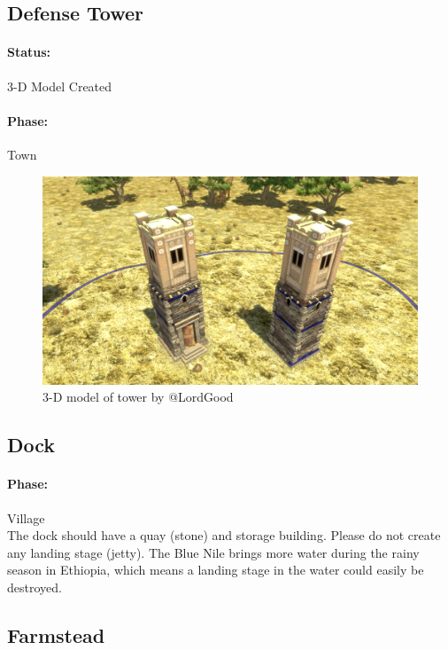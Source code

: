 \documentclass[a4paper,12pt]{scrreprt}
\begin{document}
\subsection{Defense Tower}

\paragraph{Status:} 3-D Model Created\\
\paragraph{Phase:} Town\\


\begin{figure}[H]
	\centering
	\includegraphics[width=\textwidth]{img/tower/tower}
	\caption{3-D model of tower by @LordGood}
\end{figure}

\subsection{Dock}

\paragraph{Phase:} Village\\

The dock should have a quay (stone) and storage building. Please do not create any landing stage (jetty). The Blue Nile brings more water during the rainy season in Ethiopia, which means a landing stage in the water could easily be destroyed.

\subsection{Farmstead}
\end{document}
